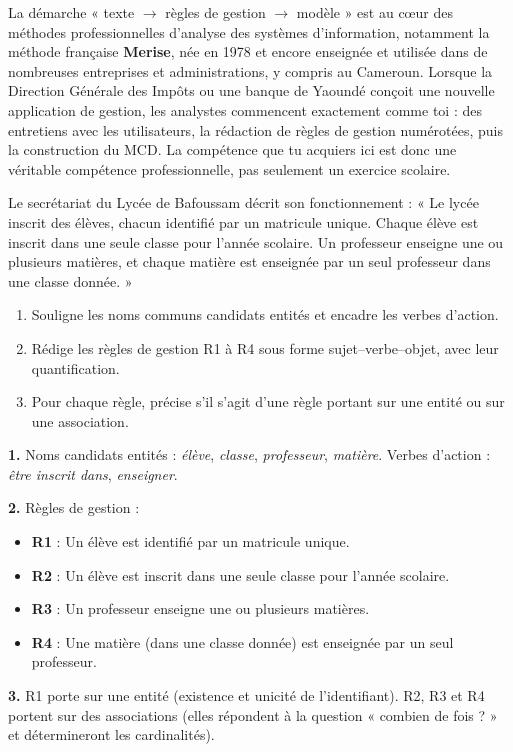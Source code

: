 \documentclass[11pt]{article}
\begin{document}
\begin{savaistu}
La démarche « texte $\rightarrow$ règles de gestion $\rightarrow$ modèle » est au cœur des méthodes professionnelles d'analyse des systèmes d'information, notamment la méthode française \textbf{Merise}, née en 1978 et encore enseignée et utilisée dans de nombreuses entreprises et administrations, y compris au Cameroun. Lorsque la Direction Générale des Impôts ou une banque de Yaoundé conçoit une nouvelle application de gestion, les analystes commencent exactement comme toi : des entretiens avec les utilisateurs, la rédaction de règles de gestion numérotées, puis la construction du MCD. La compétence que tu acquiers ici est donc une véritable compétence professionnelle, pas seulement un exercice scolaire.
\end{savaistu}

\begin{exercice}
Le secrétariat du Lycée de Bafoussam décrit son fonctionnement : « Le lycée inscrit des élèves, chacun identifié par un matricule unique. Chaque élève est inscrit dans une seule classe pour l'année scolaire. Un professeur enseigne une ou plusieurs matières, et chaque matière est enseignée par un seul professeur dans une classe donnée. »
\begin{enumerate}
\item Souligne les noms communs candidats entités et encadre les verbes d'action.
\item Rédige les règles de gestion R1 à R4 sous forme sujet--verbe--objet, avec leur quantification.
\item Pour chaque règle, précise s'il s'agit d'une règle portant sur une entité ou sur une association.
\end{enumerate}
\end{exercice}

\begin{corrige}[Exercice 1]
\textbf{1.} Noms candidats entités : \emph{élève}, \emph{classe}, \emph{professeur}, \emph{matière}. Verbes d'action : \emph{être inscrit dans}, \emph{enseigner}.

\textbf{2.} Règles de gestion :
\begin{itemize}
\item \textbf{R1} : Un élève est identifié par un matricule unique.
\item \textbf{R2} : Un élève est inscrit dans une seule classe pour l'année scolaire.
\item \textbf{R3} : Un professeur enseigne une ou plusieurs matières.
\item \textbf{R4} : Une matière (dans une classe donnée) est enseignée par un seul professeur.
\end{itemize}

\textbf{3.} R1 porte sur une entité (existence et unicité de l'identifiant). R2, R3 et R4 portent sur des associations (elles répondent à la question « combien de fois ? » et détermineront les cardinalités).
\end{corrige}
\end{document}
